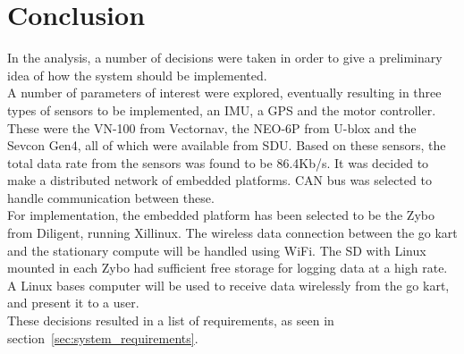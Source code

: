 





\section{Conclusion}
\label{sec:analysisconclusion}
In the analysis, a number of decisions were taken in order to give a preliminary idea of how the system should be implemented. \\

A number of parameters of interest were explored, eventually resulting in three types of sensors to be implemented, an IMU, a GPS and the motor controller.
These were the VN-100 from Vectornav, the NEO-6P from U-blox and the Sevcon Gen4, all of which were available from SDU.
Based on these sensors, the total data rate from the sensors was found to be 86.4Kb/s.
It was decided to make a distributed network of embedded platforms. 
CAN bus was selected to handle communication between these.\\

For implementation, the embedded platform has been selected to be the Zybo from Diligent, running Xillinux.
The wireless data connection between the go kart and the stationary compute will be handled using WiFi.
The SD with Linux mounted in each Zybo had sufficient free storage for logging data at a high rate.
A Linux bases computer will be used to receive data wirelessly from the go kart, and present it to a user. \\

These decisions resulted in a list of requirements, as seen in section~\ref{sec:system_requirements}.

